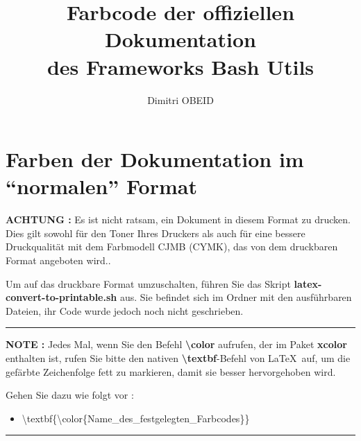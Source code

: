 \documentclass[a4paper,10pt]{article}
\title{\color{red}Farbcode \color{orange}der \color{yellow}offiziellen \color{green}Dokumentation \\\color{blue}des \color{violet}Frameworks \color{red}Bash \color{orange}Utils}\color{text}
\author{Dimitri OBEID}
\begin{document}
    \maketitle
    \newpage

    \hypertarget{contents}{}
    \tableofcontents
    \newpage

    \color{sec1}
    \section{Farben der Dokumentation im ``normalen'' Format}\color{text}

    \begin{justify}
        \textbf{\color{case}ACHTUNG :} Es ist nicht ratsam, ein Dokument in diesem Format zu drucken. Dies gilt sowohl für den Toner Ihres Druckers als auch für eine bessere Druckqualität mit dem Farbmodell CJMB (CYMK), das von dem druckbaren Format angeboten wird..

        Um auf das druckbare Format umzuschalten, führen Sie das Skript \textbf{\color{cmds}latex-convert-to-printable.sh} aus. Sie befindet sich im Ordner mit den ausführbaren Dateien, ihr Code wurde jedoch noch nicht geschrieben.
    \end{justify}

    \color{text}\par\noindent\rule{\textwidth}{0.4pt}\color{text}

    \begin{justify}
        \textbf{NOTE :} Jedes Mal, wenn Sie den Befehl \textbf{\textbackslash{color}} aufrufen, der im Paket \textbf{xcolor} enthalten ist, rufen Sie bitte den nativen \textbf{\textbackslash{textbf}}-Befehl von \LaTeX \ auf, um die gefärbte Zeichenfolge fett zu markieren, damit sie besser hervorgehoben wird.
    \end{justify}

    \begin{justify}
        Gehen Sie dazu wie folgt vor :

        \begin{itemize}
              \item \textbackslash{textbf\{\textbackslash{color\{Name\_des\_festgelegten\_Farbcodes}\}}\}
          \end{itemize}
    \end{justify}

    \color{text}\par\noindent\rule{\textwidth}{0.4pt}\color{text}
\end{document}
